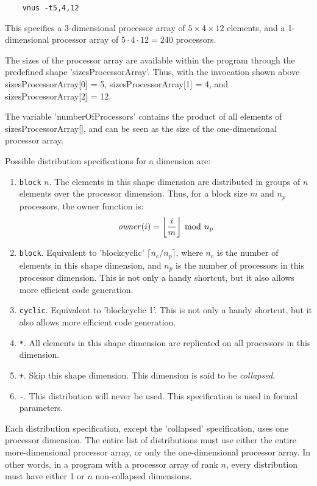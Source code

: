 \documentclass[a4paper]{article}
\newcommand{\fnname}[1]{{\it #1}}
\newcommand{\mymod}{{\ \bmod \ }}
\newcommand{\floor}[1]{{\left \lfloor #1 \right \rfloor}}
\begin{document}
\begin{verbatim}
    vnus -t5,4,12
\end{verbatim}
This specifies a 3-dimensional processor array of $5 \times 4 \times 12$ elements,
and a 1-dimensional processor array of $5 \cdot 4 \cdot 12 = 240$ processors.
\par
The sizes of the processor array are available within the program
through the predefined shape 'sizesProcessorArray'. Thus, with the
invocation shown above sizesProcessorArray[0] = 5,
sizesProcessorArray[1] = 4, and sizesProcessorArray[2] = 12.
\par
The variable 'numberOfProcessors' contains the product
of all elements of sizesProcessorArray[], and can be seen as the
size of the one-dimensional processor array.
\par
Possible distribution specifications for a dimension are:
\begin{enumerate}
\item \verb'block' $n$. The elements in this shape dimension are distributed
  in groups of $n$ elements over the processor dimension.
Thus, for a block size $m$ and $n_p$ processors, the owner function is:
\[ \fnname{owner}( i ) = \floor{\frac{i}{m}} \mymod n_p \]

\item \verb'block'. Equivalent to 'blockcyclic' $\lceil n_e/n_p \rceil$,
   where $n_e$ is the
   number of elements in this shape dimension, and $n_p$ is the number
   of processors in this processor dimension. This is not only a handy
   shortcut, but it also allows more efficient code generation.

\item \verb'cyclic'. Equivalent to 'blockcyclic 1'. This is not only a handy
  shortcut, but it also allows more efficient code generation.

\item \verb'*'. All elements in this shape dimension are replicated on
  all processors in this dimension.

\item \verb'+'. Skip this shape dimension. This dimension is said to
      be {\em collapsed}.

\item \verb'-'. This distribution will never be used. This specification
      is used in formal parameters.
\end{enumerate}

Each distribution specification, except the 'collapsed' specification,
uses one processor dimension. The entire list of distributions must use
either the entire more-dimensional processor array, or only the
one-dimensional processor array. In other words, in a program with a
processor array of rank $n$, every distribution must have either 1
or $n$ non-collapsed dimensions.
\end{document}
